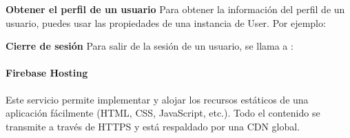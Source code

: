\textbf{Obtener el perfil de un usuario}
\label{\detokenize{firebase_web:obtener-el-perfil-de-un-usuario}}
Para obtener la información del perfil de un usuario, puedes usar las propiedades de una instancia de User. Por ejemplo:

%
\begin{sphinxVerbatim}[commandchars=\\\{\}]
   
     

    
    
    
    
    
                 

\end{sphinxVerbatim}


\textbf{Cierre de sesión}
\label{\detokenize{firebase_web:cierre-de-sesion}}
Para salir de la sesión de un usuario, se llama a :

%
\begin{sphinxVerbatim}[commandchars=\\\{\}]
 
     
 
     
\end{sphinxVerbatim}


\paragraph{Firebase Hosting}
\label{\detokenize{firebase_web:firebase-hosting}}
Este servicio permite implementar y alojar los recursos estáticos de una aplicación
fácilmente (HTML, CSS, JavaScript, etc.). Todo el contenido se transmite a través
de HTTPS y está respaldado por una CDN global.

